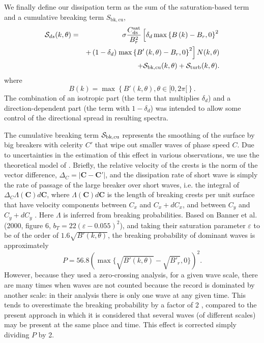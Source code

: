 We finally define our dissipation term as the sum of the saturation-based term
and a cumulative breaking term $S_{\mathrm{bk,cu}}$,
\begin{eqnarray}
\cS_{ds}(k,\theta)& =&  \sigma
 \frac{C_{\mathrm{ds}}^{\mathrm{sat}}}{B^2_r} \left[ \delta_d
\max\left\{ B\left(k\right) -
B_r,0\right\}^2 \right.
\nonumber \\
  & & +  \left(1-\delta_d \right) \left. \max\left\{B'\left(k,\theta \right)- B_r
 ,0\right\}^2\right]N(k,\theta)  \nonumber \\
 & & + \cS_{\mathrm{bk,cu}}(k,\theta) + \cS_{\mathrm{turb}}(k,\theta) \label{Sds_all}.
\end{eqnarray}
where
\begin{equation}
B\left(k \right)=\max\left\{B'(k,\theta), \theta \in [0,2
\pi[\right\} \label{defBof}.
\end{equation}
The combination of an isotropic part (the term that multiplies $ \delta_d$)
and a direction-dependent part (the term with $1-\delta_d$) was intended to
allow some control of the directional spread in resulting spectra.

The cumulative breaking term ${\cal S}_{\mathrm{bk,cu}}$ represents the smoothing
of the surface by big breakers with celerity $C'$ that wipe out smaller waves
of phase speed $C$. Due to uncertainties in the estimation of this effect in
various observations, we use the theoretical model of
\cite{art:Aea09}. Briefly, the relative velocity of the crests is the norm of
the vector difference, $\Delta_C =\left|\mathbf{C}-\mathbf{C}'\right|$, and
the dissipation rate of short wave is simply the rate of passage of the large
breaker over short waves, i.e. the integral of $\Delta_C \Lambda(\mathbf{C})
d\mathbf{C}$, where $\Lambda (\mathbf{C}) d\mathbf{C}$ is the length of
breaking crests per unit surface that have velocity components between $C_x$
and $C_x+dC_x$, and between $C_y$ and $C_y+dC_y$ \citep{art:Phi85}.  Here
$\Lambda$ is inferred from breaking probabilities. Based on Banner et
al. (2000, figure 6, $b_T=22
\left(\varepsilon-0.055\right)^2$)\nocite{art:BBY00}, and taking their
saturation parameter $\varepsilon$ to be of the order of $1.6
\sqrt{B'(k,\theta)}$, the breaking probability of dominant waves is
approximately
\begin{equation}
P=56.8\left(\max\{\sqrt{B'(k,\theta)}-\sqrt{B'_r},0\}\right)^2.\label{PBanner}
\end{equation}
However, because they used a zero-crossing analysis, for a given wave scale,
there are many times when waves are not counted because the record is
dominated by another scale: in their analysis there is only one wave at any
given time.  This tends to overestimate the breaking probability by a factor
of 2 \citep{art:FAB10}, compared to the present approach in which it is 
considered that several waves (of different scales) may be present at the same place and
time. This effect is corrected simply dividing $P$ by 2.

